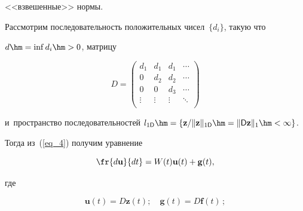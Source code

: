 <<взвешенные>> нормы.

Рассмотрим  последовательность положительных чисел~$\{ d_i\}$, такую что 

$d\hm=\mathrm{inf}\, d_i \hm>0$, матрицу

\begin{equation*}


D= \left(

\begin{array}{cccc}

d_{1}   & d_{1}  & d_{1}   &   \cdots  \\[3pt]

0       & d_{2}  & d_{2}   &   \cdots  \\[3pt]

0       & 0      & d_{3}   &   \cdots  \\[3pt]

\vdots  & \vdots & \vdots  &   \ddots  \\[3pt]

\end{array}

\right) 

\end{equation*}

 и~пространство последовательностей $l_{1\textsf{D}} \hm= \left\{\mathbf{z}/\|\mathbf{z}\|_{1\textsf{D}}\hm=\|\textsf{D}\mathbf{z}\|_1 \hm< \infty\right\} $.



Тогда из~(\ref{eq_4}) получим уравнение



\vspace*{2pt}



\noindent

\begin{equation*}


    \fr{d\mathbf{u}}{dt}=W(t)\mathbf{u}(t)+\mathbf{g}(t),

\end{equation*}

где 

$$

 \mathbf{u}(t) = D\mathbf{z}(t);\quad  \mathbf{g}(t) = D\mathbf{f}(t)\,;

 $$

 


